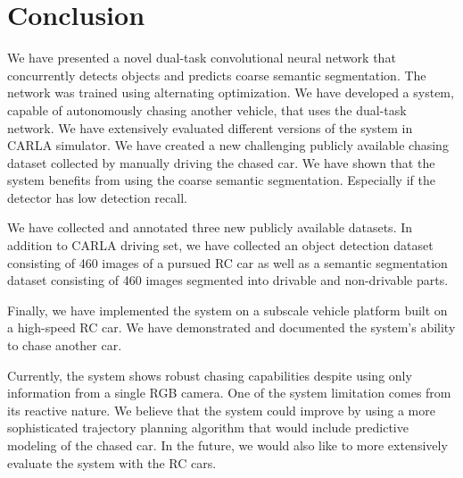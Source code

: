 \documentclass{ctuthesis/ctuthesis}
\begin{document}
\chapter{Conclusion} \label{s:conclusion}
We have presented a novel dual-task convolutional neural network that concurrently detects objects and predicts coarse semantic segmentation. The network was trained using alternating optimization. We have developed a system, capable of autonomously chasing another vehicle, that uses the dual-task network. We have extensively evaluated different versions of the system in CARLA simulator. We have created a new challenging publicly available chasing dataset collected by manually driving the chased car. We have shown that the system benefits from using the coarse semantic segmentation. Especially if the detector has low detection recall.\par
We have collected and annotated three new publicly available datasets. In addition to CARLA driving set, we have collected an object detection dataset consisting of 460 images of a pursued RC car as well as a semantic segmentation dataset consisting of 460 images segmented into drivable and non-drivable parts. \par
Finally, we have implemented the system on a subscale vehicle platform built on a high-speed RC car. We have demonstrated and documented \cite{my_yt_video} the system's ability to chase another car.\par
Currently, the system shows robust chasing capabilities despite using only information from a single RGB camera. One of the system limitation comes from its reactive nature. We believe that the system could improve by using a more sophisticated trajectory planning algorithm that would include predictive modeling of the chased car. In the future, we would also like to more extensively evaluate the system with the RC cars.



\end{document}
